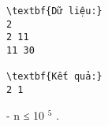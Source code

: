 \begin{verbatim}
\textbf{Dữ liệu:}
2
2 11
11 30

\textbf{Kết quả:}
2 1
\end{verbatim}
- n ≤ 10   $^    5   $   .